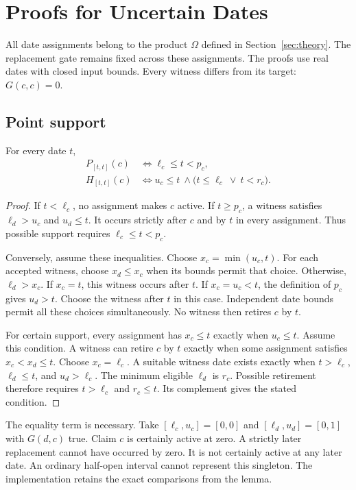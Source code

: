 \section{Proofs for Uncertain Dates}
\label{app:uncertain-proofs}

All date assignments belong to the product $\Omega$ defined in Section~\ref{sec:theory}.
The replacement gate remains fixed across these assignments.
The proofs use real dates with closed input bounds.
Every witness differs from its target: $G(c,c)=0$.

\subsection{Point support}
\begin{lemma}
\label{lem:uncertain-point}
For every date $t$,
\begin{align}
 P_{[t,t]}(c)&\iff \ell_c\leq t<p_c,\\
 H_{[t,t]}(c)&\iff u_c\leq t\ \land\bigl(t\leq\ell_c\ \lor\ t<r_c\bigr).
\end{align}
\end{lemma}
\begin{proof}
If $t<\ell_c$, no assignment makes $c$ active.
If $t\geq p_c$, a witness satisfies $\ell_d>u_c$ and $u_d\leq t$.
It occurs strictly after $c$ and by $t$ in every assignment.
Thus possible support requires $\ell_c\leq t<p_c$.

Conversely, assume these inequalities.
Choose $x_c=\min(u_c,t)$.
For each accepted witness, choose $x_d\leq x_c$ when its bounds permit that choice.
Otherwise, $\ell_d>x_c$.
If $x_c=t$, this witness occurs after $t$.
If $x_c=u_c<t$, the definition of $p_c$ gives $u_d>t$.
Choose the witness after $t$ in this case.
Independent date bounds permit all these choices simultaneously.
No witness then retires $c$ by $t$.

For certain support, every assignment has $x_c\leq t$ exactly when $u_c\leq t$.
Assume this condition.
A witness can retire $c$ by $t$ exactly when some assignment satisfies $x_c<x_d\leq t$.
Choose $x_c=\ell_c$.
A suitable witness date exists exactly when
$t>\ell_c$, $\ell_d\leq t$, and $u_d>\ell_c$.
The minimum eligible $\ell_d$ is $r_c$.
Possible retirement therefore requires $t>\ell_c$ and $r_c\leq t$.
Its complement gives the stated condition.
\end{proof}

The equality term is necessary.
Take $[\ell_c,u_c]=[0,0]$ and $[\ell_d,u_d]=[0,1]$ with $G(d,c)$ true.
Claim $c$ is certainly active at zero.
A strictly later replacement cannot have occurred by zero.
It is not certainly active at any later date.
An ordinary half-open interval cannot represent this singleton.
The implementation retains the exact comparisons from the lemma.

